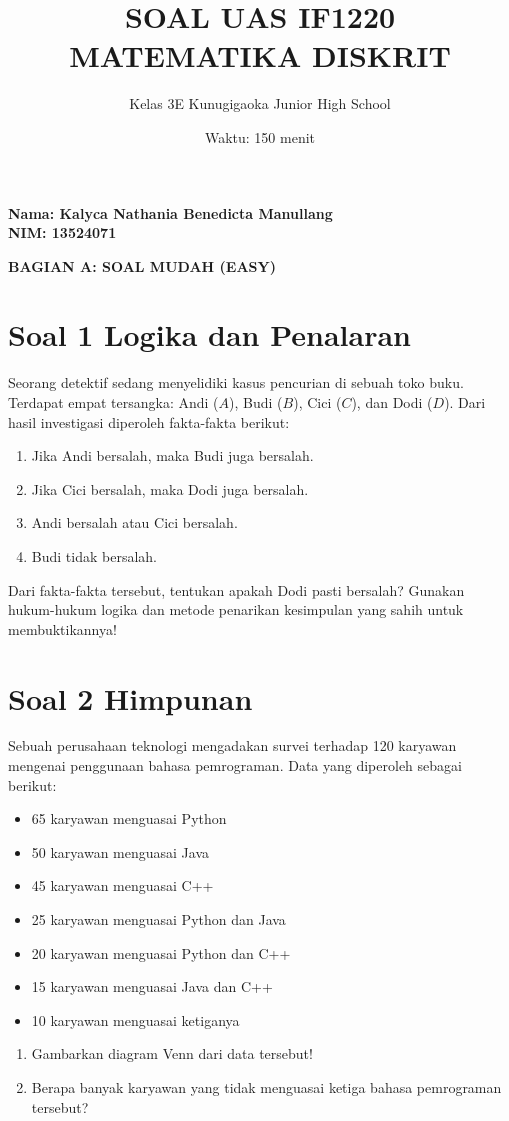 \documentclass[12pt,a4paper]{article}
\title{SOAL UAS IF1220 MATEMATIKA DISKRIT}
\author{Kelas 3E Kunugigaoka Junior High School}
\date{Waktu: 150 menit}
\begin{document}
\noindent \textbf{Nama: Kalyca Nathania Benedicta Manullang} \\
\noindent \textbf{NIM: 13524071}
\vspace{0.3cm}

\maketitle

\begin{center}
\large \textbf{BAGIAN A: SOAL MUDAH (EASY)}
\end{center}

\section*{Soal 1 Logika dan Penalaran}
Seorang detektif sedang menyelidiki kasus pencurian di sebuah toko buku. Terdapat empat tersangka: Andi ($A$), Budi ($B$), Cici ($C$), dan Dodi ($D$). Dari hasil investigasi diperoleh fakta-fakta berikut:
\begin{enumerate}
    \item Jika Andi bersalah, maka Budi juga bersalah.
    \item Jika Cici bersalah, maka Dodi juga bersalah.
    \item Andi bersalah atau Cici bersalah.
    \item Budi tidak bersalah.
\end{enumerate}
Dari fakta-fakta tersebut, tentukan apakah Dodi pasti bersalah? Gunakan hukum-hukum logika dan metode penarikan kesimpulan yang sahih untuk membuktikannya!

\section*{Soal 2 Himpunan}
Sebuah perusahaan teknologi mengadakan survei terhadap 120 karyawan mengenai penggunaan bahasa pemrograman. Data yang diperoleh sebagai berikut:
\begin{itemize}
    \item 65 karyawan menguasai Python
    \item 50 karyawan menguasai Java
    \item 45 karyawan menguasai C++
    \item 25 karyawan menguasai Python dan Java
    \item 20 karyawan menguasai Python dan C++
    \item 15 karyawan menguasai Java dan C++
    \item 10 karyawan menguasai ketiganya
\end{itemize}
\begin{enumerate}[label=(\alph*)]
    \item Gambarkan diagram Venn dari data tersebut!
    \item Berapa banyak karyawan yang tidak menguasai ketiga bahasa pemrograman tersebut?
\end{enumerate}
\end{document}
